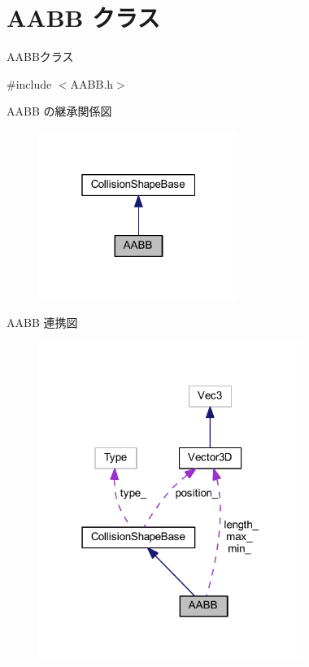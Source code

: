 \hypertarget{class_a_a_b_b}{}\section{A\+A\+BB クラス}
\label{class_a_a_b_b}


A\+A\+B\+Bクラス  




{\ttfamily \#include $<$A\+A\+B\+B.\+h$>$}



A\+A\+BB の継承関係図\nopagebreak
\begin{figure}[H]
\begin{center}
\leavevmode
\includegraphics[width=184pt]{class_a_a_b_b__inherit__graph}
\end{center}
\end{figure}


A\+A\+BB 連携図\nopagebreak
\begin{figure}[H]
\begin{center}
\leavevmode
\includegraphics[width=243pt]{class_a_a_b_b__coll__graph}
\end{center}
\end{figure}
